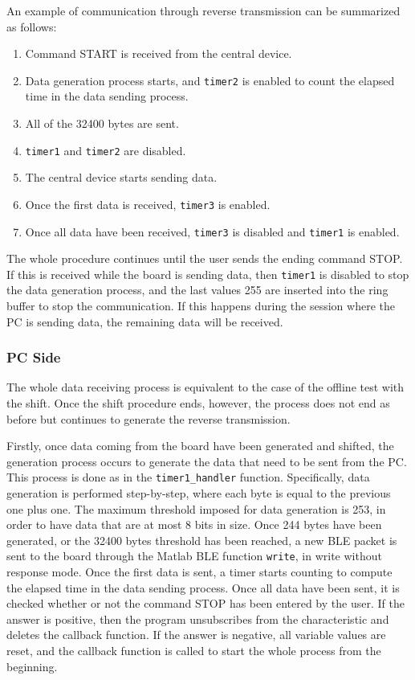 \documentclass{Configuration_Files/PoliMi3i_thesis}
\begin{document}
An example of communication through reverse transmission can be summarized as follows:

\begin{enumerate}
    \item Command START is received from the central device.
    \item Data generation process starts, and \texttt{timer2} is enabled to count the elapsed time in the data sending process.
    \item All of the 32400 bytes are sent.
    \item \texttt{timer1} and \texttt{timer2} are disabled.
    \item The central device starts sending data.
    \item Once the first data is received, \texttt{timer3} is enabled.
    \item Once all data have been received, \texttt{timer3} is disabled and \texttt{timer1} is enabled.
\end{enumerate}

The whole procedure continues until the user sends the ending command STOP. If this is received while the board is sending data, then \texttt{timer1} is disabled to stop the data generation process, and the last values 255 are inserted into the ring buffer to stop the communication. If this happens during the session where the PC is sending data, the remaining data will be received.

\subsubsection{PC Side}

The whole data receiving process is equivalent to the case of the offline test with the shift. Once the shift procedure ends, however, the process does not end as before but continues to generate the reverse transmission.

Firstly, once data coming from the board have been generated and shifted, the generation process occurs to generate the data that need to be sent from the PC. This process is done as in the \texttt{timer1\_handler} function. Specifically, data generation is performed step-by-step, where each byte is equal to the previous one plus one. The maximum threshold imposed for data generation is 253, in order to have data that are at most 8 bits in size. Once 244 bytes have been generated, or the 32400 bytes threshold has been reached, a new BLE packet is sent to the board through the Matlab BLE function \texttt{write}, in write without response mode. Once the first data is sent, a timer starts counting to compute the elapsed time in the data sending process. Once all data have been sent, it is checked whether or not the command STOP has been entered by the user. If the answer is positive, then the program unsubscribes from the characteristic and deletes the callback function. If the answer is negative, all variable values are reset, and the callback function is called to start the whole process from the beginning.
\end{document}
